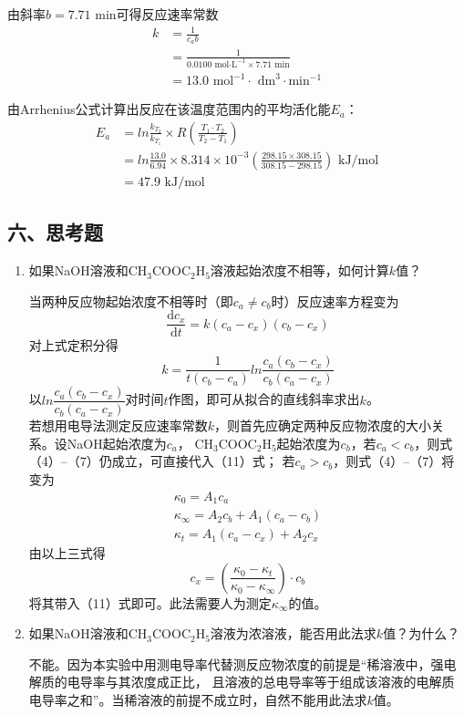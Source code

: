 \documentclass[a4paper]{ctexart}
\begin{document}
		由斜率$b=7.71$ min可得反应速率常数
		\begin{align*}
			k&=\frac{1}{c_ab} \\
			&=\frac{1}{0.0100\text{ mol·L}^{-1}\times7.71\text{ min}} \\
			&=13.0\text{ mol}^{-1}\cdot \text{ dm}^3\cdot \text{min}^{-1}
		\end{align*}
		
		由Arrhenius公式计算出反应在该温度范围内的平均活化能$E_a$：
		\begin{align*}
			E_a	&=ln\frac{k_{T_2}}{k_{T_1}}\times R\left(\frac{T_1\cdot T_2}{T_2-T_1}\right) \\
				&=ln\frac{13.0}{6.94}\times 8.314\times 10^{-3}\left(\frac{298.15\times 308.15}{308.15-298.15}\right)\text{ kJ/mol}\\
				&=47.9\text{ kJ/mol}
		\end{align*}
		
	\subsection*{六、思考题}
		\begin{enumerate}
		\item 如果NaOH溶液和CH$_3$COOC$_2$H$_5$溶液起始浓度不相等，如何计算$k$值？\par
		当两种反应物起始浓度不相等时（即$c_a\neq c_b$时）反应速率方程变为
		\begin{equation}
			\frac{\mathrm{d}c_x}{\mathrm{d}t}=k\left(c_a-c_x\right)\left(c_b-c_x\right)
		\end{equation}
		对上式定积分得
		\begin{equation}
			k = \frac{1}{t(c_b-c_a)}ln\frac{c_a(c_b-c_x)}{c_b(c_a-c_x)}
		\end{equation}
		以$ln\dfrac{c_a(c_b-c_x)}{c_b(c_a-c_x)}$对时间$t$作图，即可从拟合的直线斜率求出$k$。\\[6pt]
		若想用电导法测定反应速率常数$k$，则首先应确定两种反应物浓度的大小关系。设NaOH起始浓度为$c_a$，
		CH$_3$COOC$_2$H$_5$起始浓度为$c_b$，若$c_a<c_b$，则式（4）--（7）仍成立，可直接代入（11）式；
		若$c_a>c_b$，则式（4）--（7）将变为
		\begin{gather}
			\kappa_0=A_1c_a \\
			\kappa_\infty=A_2c_b+A_1(c_a-c_b) \\
			\kappa_t=A_1\left(c_a-c_x\right)+A_2c_x
		\end{gather}
		由以上三式得
		\begin{equation}
			c_x=\left(\frac{\kappa_0-\kappa_t}{\kappa_0-\kappa_\infty}\right)\cdot c_b
		\end{equation}
		将其带入（11）式即可。此法需要人为测定$\kappa_\infty$的值。
		\item 如果NaOH溶液和CH$_3$COOC$_2$H$_5$溶液为浓溶液，能否用此法求$k$值？为什么？\par
		不能。因为本实验中用测电导率代替测反应物浓度的前提是“稀溶液中，强电解质的电导率与其浓度成正比，
		且溶液的总电导率等于组成该溶液的电解质电导率之和”。当稀溶液的前提不成立时，自然不能用此法求$k$值。
		\end{enumerate}
		
\end{document}
